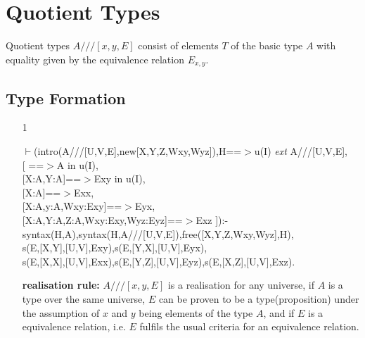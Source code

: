 \documentclass[11pt]{report}
\newcommand{\inv}[1]{\index{#1}}
\begin{document}
  
 \section{Quotient Types}
 \inv{quotient type}
 Quotient types $A///[x,y,E]$ consist of 
 elements $T$ of the basic type $A$ with equality given by the 
 equivalence relation $E_{x,y}$.
  
 \subsection{Type Formation}
  
 \begin{enumerate}
 \item[1]
\begin{sf}\begin{tabbing}
$\vdash$(intro(A///[U,V,E],new[X,Y,Z,Wxy,Wyz]),H==$>$u(I) \mbox{\it ext} A///[U,V,E],\\[-0.15ex]
\hspace{2em}[ ==$>$A in u(I), \\[-0.15ex]
\hspace{3em}[X:A,Y:A]==$>$Exy in u(I),\\[-0.15ex]
\hspace{3em}[X:A]==$>$Exx, \\[-0.15ex]
\hspace{3em}[X:A,y:A,Wxy:Exy]==$>$Eyx, \\[-0.15ex]
\hspace{3em}[X:A,Y:A,Z:A,Wxy:Exy,Wyz:Eyz]==$>$Exz ]):-\\[-0.15ex]
\hspace{2em}syntax(H,A),syntax(H,A///[U,V,E]),free([X,Y,Z,Wxy,Wyz],H),\\[-0.15ex]
\hspace{2em}s(E,[X,Y],[U,V],Exy),s(E,[Y,X],[U,V],Eyx),\\[-0.15ex]
\hspace{2em}s(E,[X,X],[U,V],Exx),s(E,[Y,Z],[U,V],Eyz),s(E,[X,Z],[U,V],Exz).
\end{tabbing}\end{sf}

 {\bf realisation rule:} 
 $A///[x,y,E]$ is a realisation for any universe, 
 if $A$ is a type over the same universe,
 $E$ can be proven to be a type(proposition) under the assumption
 of $x$ and $y$ being elements of the type $A$, and if
 $E$ is a equivalence relation, i.e. $E$ fulfils the usual criteria
 for an equivalence relation.
  

\end{enumerate}
\end{document}
